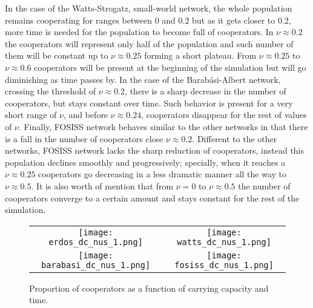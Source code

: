 \documentclass[11pt]{article}
\begin{document}
In the case of the Watts-Strogatz, small-world network, the whole population
remains cooperating for ranges between $0$ and $0.2$ but as it gets closer to
$0.2$, more time is needed for the population to become full of cooperators. In
$\nu \approx 0.2$ the cooperators will represent only half of the population and
such number of them will be constant up to $\nu \approx 0.25$ forming a short
plateau. From $\nu \approx 0.25$ to $\nu \approx 0.6$ cooperators will be
present at the beginning of the simulation but will go diminishing as time passes
by. In the case of the Barab\'asi-Albert network, crossing the threshold of $\nu
\approx 0.2$, there is a sharp decrease in the number of cooperators, but stays
constant over time. Such behavior is present for a very short range of $\nu$, and
before $\nu \approx 0.24$, cooperators disappear for the rest of values of
$\nu$. Finally, FOSISS network behaves similar to the other networks in that
there is a fall in the number of cooperators close  $\nu \approx 0.2$. Different
to the other networks, FOSISS network lacks the sharp reduction of
cooperators, instead this population declines smoothly and progressively;
specially, when it reaches a $\nu \approx 0.25$ cooperators go 
decreasing in a less dramatic manner all the way to $\nu \approx 0.5$. It is
also worth of mention that from $\nu = 0$ to $\nu \approx 0.5$ the number of
cooperators converge to a certain amount and stays constant for the rest of the
simulation. 




\begin{figure} [h!]
\centering
\begin{tabular}{cc}

\texttt{[image: erdos\_dc\_nus\_1.png]} & \texttt{[image: watts\_dc\_nus\_1.png]} \\
\texttt{[image: barabasi\_dc\_nus\_1.png]} & \texttt{[image: fosiss\_dc\_nus\_1.png]}
\end{tabular}
\caption{Proportion of cooperators as a function of carrying capacity and time.}\label{CD}
\end{figure}

\FloatBarrier
\end{document}
